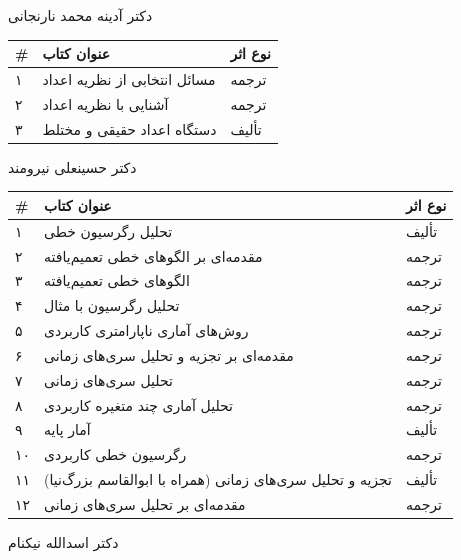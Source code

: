 \documentclass[
  letterpaper,
  DIV=11,
  numbers=noendperiod]{scrreprt}
\newcounter{none} %
\begin{document}
دکتر آدینه محمد نارنجانی

{\def\LTcaptype{none} %
\begin{longtable}[]{@{}lll@{}}
\toprule\noalign{}
\# & عنوان کتاب & نوع اثر \\
\midrule\noalign{}
\endhead
\bottomrule\noalign{}
\endlastfoot
۱ & مسائل انتخابی از نظریه اعداد & ترجمه \\
۲ & آشنایی با نظریه اعداد & ترجمه \\
۳ & دستگاه اعداد حقیقی و مختلط & تألیف \\
\end{longtable}
}

دکتر حسینعلی نیرومند

{\def\LTcaptype{none} %
\begin{longtable}[]{@{}lll@{}}
\toprule\noalign{}
\# & عنوان کتاب & نوع اثر \\
\midrule\noalign{}
\endhead
\bottomrule\noalign{}
\endlastfoot
۱ & تحلیل رگرسیون خطی & تألیف \\
۲ & مقدمه‌ای بر الگوهای خطی تعمیم‌یافته & ترجمه \\
۳ & الگوهای خطی تعمیم‌یافته & ترجمه \\
۴ & تحلیل رگرسیون با مثال & ترجمه \\
۵ & روش‌های آماری ناپارامتری کاربردی & ترجمه \\
۶ & مقدمه‌ای بر تجزیه و تحلیل سری‌های زمانی & ترجمه \\
۷ & تحلیل سری‌های زمانی & ترجمه \\
۸ & تحلیل آماری چند متغیره کاربردی & ترجمه \\
۹ & آمار پایه & تألیف \\
۱۰ & رگرسیون خطی کاربردی & ترجمه \\
۱۱ & تجزیه و تحلیل سری‌های زمانی (همراه با ابوالقاسم بزرگ‌نیا) & تألیف \\
۱۲ & مقدمه‌ای بر تحلیل سری‌های زمانی & ترجمه \\
\end{longtable}
}

دکتر اسدالله نیکنام
\end{document}
